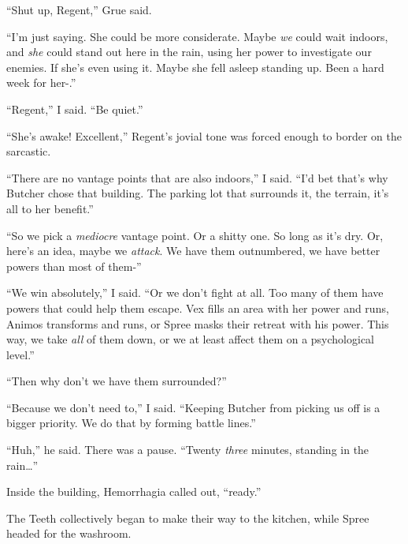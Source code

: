 ``Shut up, Regent,'' Grue said.



``I'm just saying.  She could be more considerate.  Maybe \emph{we} could wait indoors, and \emph{she} could stand out here in the rain, using her power to investigate our enemies.  If she's even using it.  Maybe she fell asleep standing up.  Been a hard week for her-.''



``Regent,'' I said.  ``Be quiet.''



``She's awake!  Excellent,'' Regent's jovial tone was forced enough to border on the sarcastic.



``There are no vantage points that are also indoors,'' I said.  ``I'd bet that's why Butcher chose that building.  The parking lot that surrounds it, the terrain, it's all to her benefit.''



``So we pick a \emph{mediocre} vantage point.  Or a shitty one.  So long as it's dry.  Or, here's an idea, maybe we \emph{attack}.  We have them outnumbered, we have better powers than most of them-''



``We win absolutely,'' I said.  ``Or we don't fight at all.  Too many of them have powers that could help them escape.  Vex fills an area with her power and runs, Animos transforms and runs, or Spree masks their retreat with his power.  This way, we take\emph{ }\emph{all} of them down, or we at least affect them on a psychological level.''



``Then why don't we have them surrounded?''



``Because we don't need to,'' I said.  ``Keeping Butcher from picking us off is a bigger priority.  We do that by forming battle lines.''



``Huh,'' he said.  There was a pause.  ``Twenty \emph{three} minutes, standing in the rain\ldots''



Inside the building, Hemorrhagia called out, ``\ldotsst ready.''



The Teeth collectively began to make their way to the kitchen, while Spree headed for the washroom.



